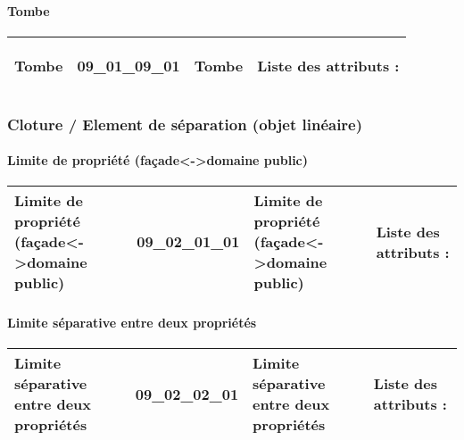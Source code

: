 \documentclass[12pt,titlepage,oneside]{book}
\begin{document}
\paragraph{Tombe}
\noindent
\vspace{\baselineskip}

\renewcommand{\arraystretch}{1.2}
\begin{supertabular}{|p{10cm}|c|p{13cm}|p{12cm}|}
 Tombe & 09\_01\_09\_01 & Tombe & Liste des attributs :
\begin{enumerate}
\end{enumerate}
\\
\hline
\end{supertabular}
\begin{figure}[h!]
  \hfill         %
\end{figure}

\subsubsection{\large Cloture / Element de séparation (objet linéaire)}
\paragraph{Limite de propriété (façade<->domaine public)}
\noindent
\vspace{\baselineskip}

\renewcommand{\arraystretch}{1.2}
\begin{supertabular}{|p{10cm}|c|p{13cm}|p{12cm}|}
 Limite de propriété (façade<->domaine public) & 09\_02\_01\_01 & Limite de propriété (façade<->domaine public) & Liste des attributs :
\begin{enumerate}
\end{enumerate}
\\
\hline
\end{supertabular}
\begin{figure}[h!]
  \hfill         %
\end{figure}


\paragraph{Limite séparative entre deux propriétés}
\noindent
\vspace{\baselineskip}

\renewcommand{\arraystretch}{1.2}
\begin{supertabular}{|p{10cm}|c|p{13cm}|p{12cm}|}
 Limite séparative entre deux propriétés & 09\_02\_02\_01 & Limite séparative entre deux propriétés & Liste des attributs :
\begin{enumerate}
\end{enumerate}
\\
\hline
\end{supertabular}
\begin{figure}[h!]
  \hfill         %
\end{figure}
\end{document}
